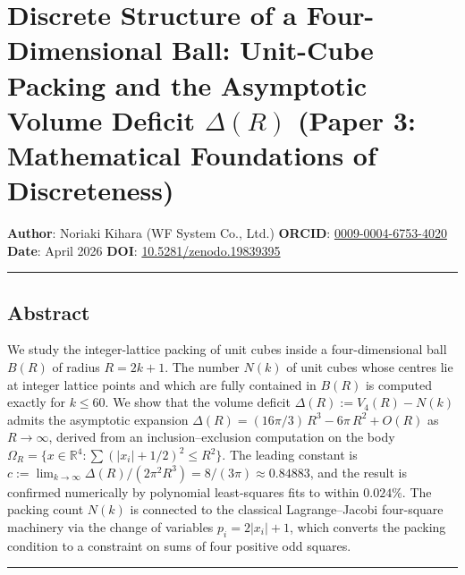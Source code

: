 \documentclass[a4paper,11pt]{article}
\theoremstyle{definition}
\begin{document}
\section{\texorpdfstring{Discrete Structure of a Four-Dimensional Ball:
Unit-Cube Packing and the Asymptotic Volume Deficit \(\Delta(R)\) (Paper
3: Mathematical Foundations of
Discreteness)}{Discrete Structure of a Four-Dimensional Ball: Unit-Cube Packing and the Asymptotic Volume Deficit \textbackslash Delta(R) (Paper 3: Mathematical Foundations of Discreteness)}}\label{discrete-structure-of-a-four-dimensional-ball-unit-cube-packing-and-the-asymptotic-volume-deficit-deltar-paper-3-mathematical-foundations-of-discreteness}

\textbf{Author}: Noriaki Kihara (WF System Co., Ltd.) \textbf{ORCID}:
\href{https://orcid.org/0009-0004-6753-4020}{0009-0004-6753-4020}
\textbf{Date}: April 2026 \textbf{DOI}:
\href{https://doi.org/10.5281/zenodo.19839395}{10.5281/zenodo.19839395}

\begin{center}\rule{0.5\linewidth}{0.5pt}\end{center}

\subsection{Abstract}\label{abstract}

We study the integer-lattice packing of unit cubes inside a
four-dimensional ball \(B(R)\) of radius \(R = 2k+1\). The number
\(N(k)\) of unit cubes whose centres lie at integer lattice points and
which are fully contained in \(B(R)\) is computed exactly for
\(k \le 60\). We show that the volume deficit
\(\Delta(R) := V_4(R) - N(k)\) admits the asymptotic expansion
\(\Delta(R) = (16\pi/3)\,R^3 - 6\pi\,R^2 + O(R)\) as \(R \to \infty\),
derived from an inclusion--exclusion computation on the body
\(\Omega_R = \{x \in \mathbb{R}^4 : \sum (|x_i|+1/2)^2 \le R^2\}\). The
leading constant is
\(c := \lim_{k\to\infty} \Delta(R)/(2\pi^2 R^3) = 8/(3\pi) \approx 0.84883\),
and the result is confirmed numerically by polynomial least-squares fits
to within \(0.024\%\). The packing count \(N(k)\) is connected to the
classical Lagrange--Jacobi four-square machinery via the change of
variables \(p_i = 2|x_i|+1\), which converts the packing condition to a
constraint on sums of four positive odd squares.

\begin{center}\rule{0.5\linewidth}{0.5pt}\end{center}
\end{document}
